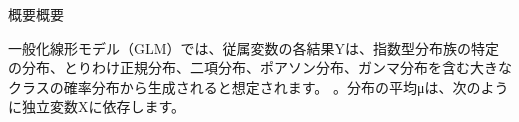 \documentclass[a4j,11pt,mc, twocolumn]{jreport}
\begin{document}
概要概要

一般化線形モデル（GLM）では、従属変数の各結果Yは、指数型分布族の特定の分布、とりわけ正規分布、二項分布、ポアソン分布、ガンマ分布を含む大きなクラスの確率分布から生成されると想定されます。 。分布の平均μは、次のように独立変数Xに依存します。









\newpage
\makeatletter
\renewcommand{\@biblabel}[1]{[#1]}
\makeatother



\end{document}

